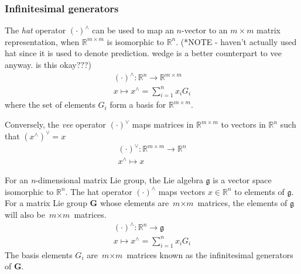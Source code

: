 		\subsubsection{Infinitesimal generators}
			The \textit{hat} operator $(\cdot)^{\wedge}$ can be used to map an $n$-vector to an $m \times m$ matrix representation, when $\mathbb{R}^{m \times m}$ is isomorphic to $\mathbb{R}^n$. (*NOTE - haven't actually used hat since it is used to denote prediction. wedge is a better counterpart to vee anyway. is this okay???)
			\begin{equation}
				\begin{split}
					(\cdot)^{\wedge}: \mathbb{R}^n \rightarrow \mathbb{R}^{m \times m}\\
					x \mapsto x^{\wedge} = \sum\limits_{i=1}^n x_iG_i
				\end{split}
			\end{equation}
			where the set of elements $G_i$ form a basis for $\mathbb{R}^{m \times m}$.
			
			Conversely, the \textit{vee} operator $(\cdot)^{\vee}$ maps matrices in $\mathbb{R}^{m \times m}$ to vectors in $\mathbb{R}^n$ such that ${(x^{\wedge})}^{\vee} = x$
			\begin{equation}
				\begin{split}
					(\cdot)^{\vee}: \mathbb{R}^{m \times m} \rightarrow \mathbb{R}^n\\
					x^{\wedge} \mapsto x
				\end{split}
			\end{equation}
		
			For an \textit{n}-dimensional matrix Lie group, the Lie algebra $\mathfrak{g}$ is a vector space isomorphic to $\mathbb{R}^n$. The hat operator $(\cdot)^{\wedge}$ maps vectors $x \in \mathbb{R}^n$ to elements of $\mathfrak{g}$.	For a matrix Lie group $\mathbf{G}$ whose elements are $\textit{m} \times \textit{m}$ matrices, the elements of $\mathfrak{g}$ will also be $\textit{m} \times \textit{m}$ matrices.		
			\begin{equation}
				\begin{split}
					(\cdot)^{\wedge}:\mathbb{R}^n \rightarrow \mathfrak{g}\\
					x \mapsto x^{\wedge} = \sum\limits_{i=1}^n x_iG_i 
				\end{split}
			\end{equation}
			The basis elements $G_i$ are $\textit{m} \times \textit{m}$ matrices known as the infinitesimal generators of $\mathbf{G}$.
									
